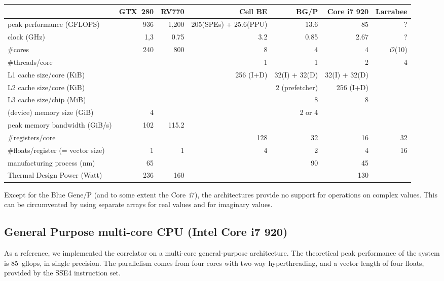 \documentclass{article}
\begin{document}
\begin{table}
\begin{center}
\begin{small}
\begin{tabular}{|l|rrrrrr|}
\hline
& GTX~280 & RV770 & Cell BE & BG/P & Core i7 920 & Larrabee \\
\hline
peak performance (GFLOPS) & 936 & 1,200 & 205(SPEs) + 25.6(PPU) & 13.6 & 85 & ? \\
clock (GHz) & 1,3 & 0.75 & 3.2 & 0.85 & 2.67 & ? \\
\#cores & 240 & 800 & 8 & 4 & 4 & $\mathcal{O}$(10) \\
\#threads/core & & & 1 & 1 & 2 & 4 \\
L1 cache size/core (KiB) & & & 256 (I+D) & 32(I) + 32(D) & 32(I) + 32(D) & \\
L2 cache size/core (KiB) & & & & 2 (prefetcher) & 256 (I+D) & \\
L3 cache size/chip (MiB) & & & & 8 & 8 & \\
(device) memory size (GiB) & 4 & &  & 2 or 4 & & \\
peak memory bandwidth (GiB/s) & 102 & 115.2 & & & & \\
\#registers/core & & & 128 & 32 & 16 & 32 \\
\#floats/register (= vector size) & 1 & 1  & 4 & 2 & 4 & 16 \\
manufacturing process (nm) & 65 & & & 90 & 45 & \\
Thermal Design Power (Watt) & 236 & 160 & & & 130 & \\
\hline
\end{tabular}
\end{small}
\end{center}
\end{table}


Except for the Blue Gene/P (and to some extent the Core~i7), the architectures
provide no support for operations on complex values.
This can be circumvented by using separate arrays for real values and for
imaginary values.


\subsection{General Purpose multi-core CPU (Intel Core i7 920)}

As a reference, we implemented the correlator on a multi-core general-purpose
architecture.
The theoretical peak performance of the system is 85~gflops, in single
precision.
The parallelism comes from four cores with two-way hyperthreading, and a vector length of four floats,
provided by the SSE4 instruction set.  
\end{document}
